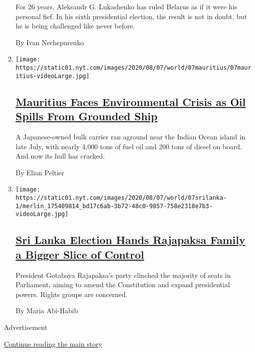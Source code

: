 \begin{enumerate}
  For 26 years, Aleksandr G. Lukashenko has ruled Belarus as if it were
  his personal fief. In his sixth presidential election, the result is
  not in doubt, but he is being challenged like never before.

  By Ivan Nechepurenko
\item
  \texttt{[image: https://static01.nyt.com/images/2020/08/07/world/07mauritius/07mauritius-videoLarge.jpg]}

  \hypertarget{mauritius-faces-environmental-crisis-as-oil-spills-from-grounded-ship}{%
  \subsection{\texorpdfstring{\href{/2020/08/07/world/africa/mauritius-oil-spill.html}{Mauritius
  Faces Environmental Crisis as Oil Spills From Grounded
  Ship}}{Mauritius Faces Environmental Crisis as Oil Spills From Grounded Ship}}\label{mauritius-faces-environmental-crisis-as-oil-spills-from-grounded-ship}}

  A Japanese-owned bulk carrier ran aground near the Indian Ocean island
  in late July, with nearly 4,000 tons of fuel oil and 200 tons of
  diesel on board. And now its hull has cracked.

  By Elian Peltier
\item
  \texttt{[image: https://static01.nyt.com/images/2020/08/07/world/07srilanka-1/merlin\_175409814\_bd17c6ab-3b72-48c0-9857-758e2318e7b3-videoLarge.jpg]}

  \hypertarget{sri-lanka-election-hands-rajapaksa-family-a-bigger-slice-of-control}{%
  \subsection{\texorpdfstring{\href{/2020/08/06/world/asia/sri-lanka-elections-rajapaksa.html}{Sri
  Lanka Election Hands Rajapaksa Family a Bigger Slice of
  Control}}{Sri Lanka Election Hands Rajapaksa Family a Bigger Slice of Control}}\label{sri-lanka-election-hands-rajapaksa-family-a-bigger-slice-of-control}}

  President Gotabaya Rajapaksa's party clinched the majority of seats in
  Parliament, aiming to amend the Constitution and expand presidential
  powers. Rights groups are concerned.

  By Maria Abi-Habib
\end{enumerate}

Advertisement

\protect\hyperlink{after-mid1}{Continue reading the main story}

